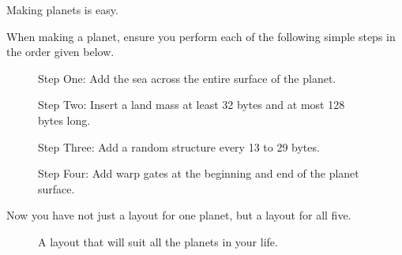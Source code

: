 Making planets is easy. 

When making a planet, ensure you perform each of the following
simple steps in the order given below.

\begin{figure}[H]
  {
    \begin{adjustbox}{width=10cm,center}
    \end{adjustbox}
  }\caption[]{Step One: Add the sea across the entire surface of the planet.}
\end{figure}

\begin{figure}[H]
  {
    \begin{adjustbox}{width=10cm,center}
    \end{adjustbox}
  }\caption[]{Step Two: Insert a land mass at least 32 bytes and at most 128 bytes long.}
\end{figure}

\begin{figure}[H]
  {
    \begin{adjustbox}{width=10cm,center}
    \end{adjustbox}
  }\caption[]{Step Three: Add a random structure every 13 to 29 bytes.}
\end{figure}

\begin{figure}[H]
  {
    \begin{adjustbox}{width=10cm,center}
    \end{adjustbox}
  }\caption[]{Step Four: Add warp gates at the beginning and end of the planet surface.}
\end{figure}

Now you have not just a layout for one planet, but a layout for all five.

\begin{figure}[H]
  {
      \begin{subfigure}{0.4\textwidth}
      \end{subfigure}
      \begin{subfigure}{0.4\textwidth}
      \end{subfigure}
      \begin{subfigure}{0.4\textwidth}
      \end{subfigure}
      \hspace{2.75cm}
      \begin{subfigure}{0.4\textwidth}
      \end{subfigure}
  }\caption[]{A layout that will suit all the planets in your life.}
\end{figure}

